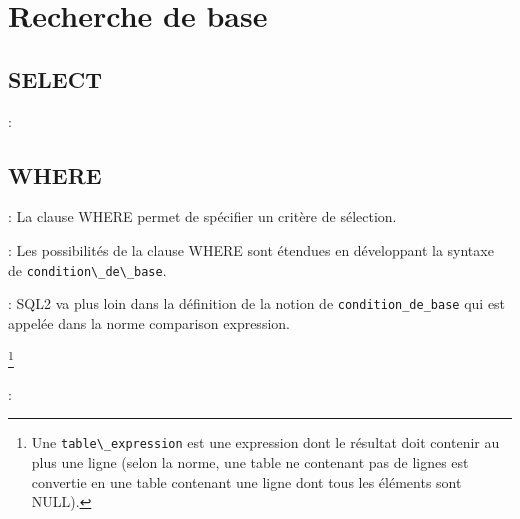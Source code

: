 \documentclass[10pt]{beamer}
\begin{document}
\section{Recherche de base}
\tocss
\subsection{SELECT}
\begin{frame}{\secname : \subsecname}
    
\end{frame}

\subsection{WHERE}
\begin{frame}{\secname : \subsecname}
    La clause WHERE permet de spécifier un critère de sélection.
    
\end{frame}

\begin{frame}{\secname : \subsecname}
    Les possibilités de la clause WHERE sont étendues en développant la syntaxe de \lstinline[language=bnf]!condition\_de\_base!.
    
\end{frame}

\begin{frame}{\secname : \subsecname}
    SQL2 va plus loin dans la définition de la notion de \lstinline[language=plsql]!condition_de_base! qui est appelée dans la norme comparison expression.
    
    \footnote{Une \lstinline[language=plsql]!table\_expression! est une expression dont le résultat doit contenir au plus une ligne (selon la norme, une table ne contenant pas de lignes est convertie en une table contenant une ligne dont tous les éléments sont NULL).}
\end{frame}

\begin{frame}{\secname : \subsecname}
    
\end{frame}
\end{document}
